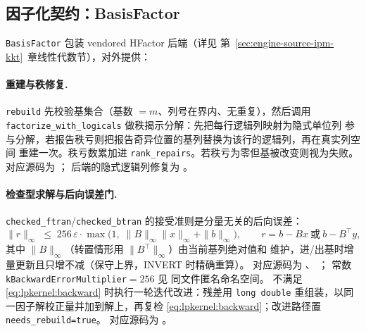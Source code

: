 \subsection{因子化契约：BasisFactor}
\label{subsec:engine-lp-factor}

\texttt{BasisFactor} 包装 vendored HFactor 后端（详见
第~\ref{sec:engine-source-ipm-kkt}~章线性代数节），对外提供：

\paragraph{重建与秩修复.}
\texttt{rebuild} 先校验基集合（基数 $=m$、列号在界内、无重复），然后调用
\texttt{factorize\_with\_logicals} 做秩揭示分解：先把每行逻辑列映射为隐式单位列
参与分解，若报告秩亏则把报告奇异位置的基列替换为该行的逻辑列，再在真实列空间
重建一次。秩亏数累加进 \texttt{rank\_repairs}。若秩亏为零但基被改变则视为失败。
对应源码为 ；
后端的隐式逻辑列修复为
。

\paragraph{检查型求解与后向误差门.}
\texttt{checked\_ftran}/\texttt{checked\_btran} 的接受准则是分量无关的后向误差：
\begin{equation}
  \|r\|_{\infty} \;\le\; 256\,\varepsilon \cdot
  \max\bigl(1,\; \|B\|_{\infty}\|x\|_{\infty} + \|b\|_{\infty}\bigr),
  \qquad r = b - Bx\ \text{或}\ b - B^{\top} y,
  \label{eq:lpkernel:backward}
\end{equation}
其中 $\|B\|_{\infty}$（转置情形用 $\|B^{\top}\|_{\infty}$）由当前基列绝对值和
维护，进/出基时增量更新且只增不减（保守上界，INVERT 时精确重算）。
对应源码为 、
；
常数 \texttt{kBackwardErrorMultiplier}${}=256$ 见
 同文件匿名命名空间。
不满足 \eqref{eq:lpkernel:backward} 时执行一轮迭代改进：残差用
\texttt{long double} 重组装，以同一因子解校正量并加到解上，再复检
\eqref{eq:lpkernel:backward}；改进路径置 \texttt{needs\_rebuild=true}。
对应源码为 。

